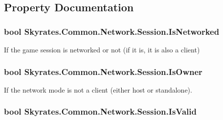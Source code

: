 \subsection{Property Documentation}
\hypertarget{class_skyrates_1_1_common_1_1_network_1_1_session_a9502bbd3da8fd21ef48dd05afd2e3743}{
\subsubsection[{Is\-Networked}]{\setlength{\rightskip}{0pt plus 5cm}bool Skyrates.\-Common.\-Network.\-Session.\-Is\-Networked\hspace{0.3cm}{\ttfamily [get]}}}\label{class_skyrates_1_1_common_1_1_network_1_1_session_a9502bbd3da8fd21ef48dd05afd2e3743}


If the game session is networked or not (if it is, it is also a client) 

\hypertarget{class_skyrates_1_1_common_1_1_network_1_1_session_a207a8acade7599cf44c03735c2604938}{
\subsubsection[{Is\-Owner}]{\setlength{\rightskip}{0pt plus 5cm}bool Skyrates.\-Common.\-Network.\-Session.\-Is\-Owner\hspace{0.3cm}{\ttfamily [get]}}}\label{class_skyrates_1_1_common_1_1_network_1_1_session_a207a8acade7599cf44c03735c2604938}


If the network mode is not a client (either host or standalone). 

\hypertarget{class_skyrates_1_1_common_1_1_network_1_1_session_a73011cb9fda86ee41cf5964989d1b9c2}{
\subsubsection[{Is\-Valid}]{\setlength{\rightskip}{0pt plus 5cm}bool Skyrates.\-Common.\-Network.\-Session.\-Is\-Valid\hspace{0.3cm}{\ttfamily [get]}}}\label{class_skyrates_1_1_common_1_1_network_1_1_session_a73011cb9fda86ee41cf5964989d1b9c2}


